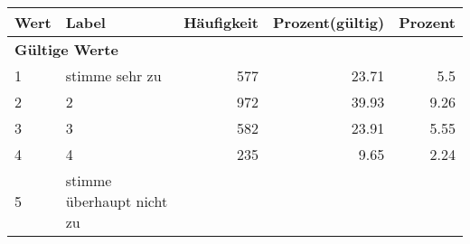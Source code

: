      \begin{longtable}{lXrrr}
     \toprule
     \textbf{Wert} & \textbf{Label} & \textbf{Häufigkeit} & \textbf{Prozent(gültig)} & \textbf{Prozent} \\
     \endhead
     \midrule
     \multicolumn{5}{l}{\textbf{Gültige Werte}}\\

     1 &
     \multicolumn{1}{X}{ stimme sehr zu   } &


       \num{577} &
       \num[round-mode=places,round-precision=2]{23,71} &
         \num[round-mode=places,round-precision=2]{5,5} \\

     2 &
     \multicolumn{1}{X}{ 2   } &


       \num{972} &
       \num[round-mode=places,round-precision=2]{39,93} &
         \num[round-mode=places,round-precision=2]{9,26} \\

     3 &
     \multicolumn{1}{X}{ 3   } &


       \num{582} &
       \num[round-mode=places,round-precision=2]{23,91} &
         \num[round-mode=places,round-precision=2]{5,55} \\

     4 &
     \multicolumn{1}{X}{ 4   } &


       \num{235} &
       \num[round-mode=places,round-precision=2]{9,65} &
         \num[round-mode=places,round-precision=2]{2,24} \\

     5 &
     \multicolumn{1}{X}{ stimme überhaupt nicht zu   } &



\end{longtable}

